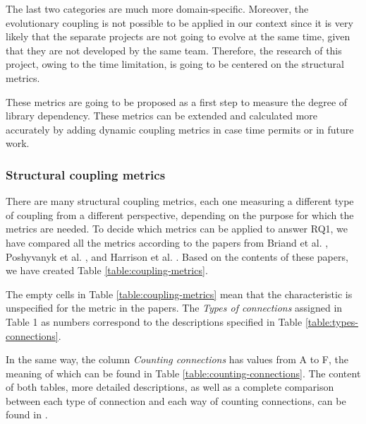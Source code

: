 \bigskip\noindent
The last two categories are much more domain-specific. Moreover, the evolutionary coupling is not possible to be applied in our context since it is very likely that the separate projects are not going to evolve at the same time, given that they are not developed by the same team. Therefore, the research of this project, owing to the time limitation, is going to be centered on the structural metrics.

These metrics are going to be proposed as a first step to measure the degree of library dependency. These metrics can be extended and calculated more accurately by adding dynamic coupling metrics in case time permits or in future work.

\subsubsection{Structural coupling metrics}
There are many structural coupling metrics, each one measuring a different type of coupling from a different perspective, depending on the purpose for which the metrics are needed.
To decide which metrics can be applied to answer RQ1, we have compared all the metrics according to the papers from Briand et al. \cite{briand1999unified}, Poshyvanyk et al. \cite{poshyvanyk2006conceptual}, and Harrison et al. \cite{harrison1998coupling}. Based on the contents of these papers, we have created Table \ref{table:coupling-metrics}.

The empty cells in Table \ref{table:coupling-metrics} mean that the characteristic is unspecified for the metric in the papers. The \textit{Types of connections} assigned in Table 1 as numbers correspond to the descriptions specified in Table \ref{table:types-connections}.

In the same way, the column \textit{Counting connections} has values from A to F, the meaning of which can be found in Table \ref{table:counting-connections}.
The content of both tables, more detailed descriptions, as well as a complete comparison between each type of connection and each way of counting connections, can be found in \cite{briand1999unified}.

